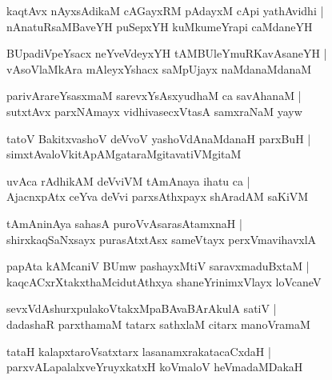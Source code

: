 \documentclass[twoside,12pt,openright]{book}
\newcounter{shloka}[chapter]
\begin{document}
\begin{shloka}%
kaqtAvx nAyxsAdikaM cAGayxRM pAdayxM cApi yathAvidhi |\\
nAnatuRsaMBaveYH puSepxYH kuMkumeYrapi caMdaneYH
\end{shloka}

\begin{shloka}%
BUpadiVpeYsacx neYveVdeyxYH tAMBUleYmuRKavAsaneYH |\\
vAsoVlaMkAra mAleyxYshacx saMpUjayx naMdanaMdanaM 
\end{shloka}

\begin{shloka}%
parivArareYsasxmaM sarevxYsAsxyudhaM ca savAhanaM |\\
sutxtAvx parxNAmayx vidhivasecxVtasA samxraNaM yayw 
\end{shloka}

\begin{shloka}%
tatoV BakitxvashoV deVvoV yashoVdAnaMdanaH parxBuH |\\
simxtAvaloVkitApAMgataraMgitavatiVMgitaM 
\end{shloka}

\begin{shloka}%
uvAca rAdhikAM deVviVM tAmAnaya ihatu ca |\\
AjacnxpAtx ceYva deVvi parxsAthxpayx shAradAM saKiVM 
\end{shloka}

\begin{shloka}%
tAmAninAya sahasA puroVvAsarasAtamxnaH |\\
shirxkaqSaNxsayx purasAtxtAsx sameVtayx perxVmavihavxlA 
\end{shloka}

\begin{shloka}%
papAta kAMcaniV BUmw pashayxMtiV saravxmaduBxtaM |\\
kaqcACxrXtakxthaMcidutAthxya shaneYrinimxVlayx loVcaneV 
\end{shloka}

\begin{shloka}%
sevxVdAshurxpulakoVtakxMpaBAvaBArAkulA satiV |\\
dadashaR parxthamaM tatarx sathxlaM citarx manoVramaM
\end{shloka}

\begin{shloka}%
tataH kalapxtaroVsatxtarx lasanamxrakatacaCxdaH |\\
parxvALapalalxveYruyxkatxH koVmaloV heVmadaMDakaH 
\end{shloka}
\end{document}
